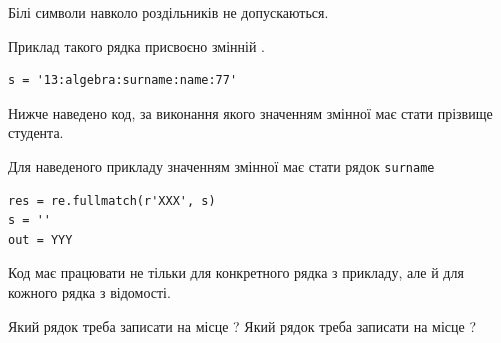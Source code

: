 \documentclass[12pt, ukrainian]{article}
\def\code#1{\Verb!#1!}
\begin{document}
{Білі символи навколо роздільників не допускаються.

Приклад такого рядка присвоєно змінній .



\begin{verbatim}
s = '13:algebra:surname:name:77'
\end{verbatim}


Нижче наведено код, за виконання якого значенням змінної  має стати прізвище студента.

Для наведеного прикладу значенням змінної  має стати рядок \code{surname}



\begin{verbatim}
res = re.fullmatch(r'XXX', s)
s = ''
out = YYY
\end{verbatim}


Код має працювати не тільки для конкретного рядка з прикладу, але й для кожного рядка з відомості.


Який рядок треба записати на місце  ?
Який рядок треба записати на місце  ?\par

}
\newpage
\end{document}

